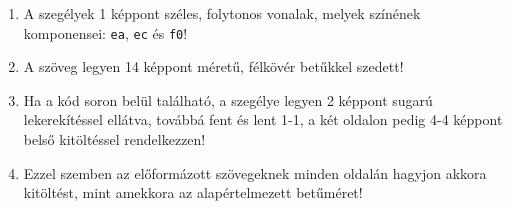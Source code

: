 \begin{frame}
\begin{columns}[c]
\begin{enumerate}
        \item A szegélyek 1 képpont széles, folytonos vonalak, melyek színének komponensei: \texttt{ea}, \texttt{ec} és \texttt{f0}!
        \item A szöveg legyen 14 képpont méretű, félkövér betűkkel szedett!
        \item Ha a kód soron belül található, a szegélye legyen 2 képpont sugarú lekerekítéssel ellátva, továbbá fent és lent 1-1, a két oldalon pedig 4-4 képpont belső kitöltéssel rendelkezzen!
        \item Ezzel szemben az előformázott szövegeknek minden oldalán hagyjon akkora kitöltést, mint amekkora az alapértelmezett betűméret!
        \setcounter{feladatSzamlalo}{\theenumi}
      \end{enumerate}
  \end{columns}
\end{frame}

